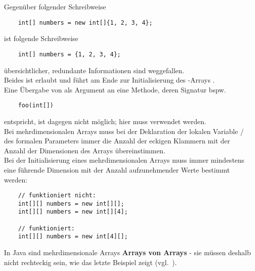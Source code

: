 \noindent
Gegenüber folgender Schreibweise

\begin{verbatim}
    int[] numbers = new int[]{1, 2, 3, 4};
\end{verbatim}

ist folgende Schreibweise

\begin{verbatim}
    int[] numbers = {1, 2, 3, 4};
\end{verbatim}

übersichtlicher, redundante Informationen sind weggefallen.\\
Beides ist erlaubt und führt am Ende zur Initialisierung des -Arrays \code{[1, 2, 3, 4]}.\\
Eine Übergabe von  als Argument an eine Methode, deren Signatur bspw.


\begin{verbatim}
    foo(int[])
\end{verbatim}

entspricht, ist dagegen nicht möglich; hier muss  verwendet werden.\\

\noindent
Bei mehrdimensionalen Arrays muss bei der Deklaration der lokalen Variable / des formalen Parameters immer die Anzahl der eckigen Klammern \code{[]} mit der Anzahl der Dimensionen des Arrays übereinstimmen.\\
Bei der Initialisierung eines mehrdimensionalen Arrays muss immer mindestens eine führende Dimension mit der Anzahl aufzunehmender Werte bestimmt werden:

\begin{verbatim}
    // funktioniert nicht:
    int[][] numbers = new int[][];
    int[][] numbers = new int[][4];

    // funktioniert:
    int[][] numbers = new int[4][];
\end{verbatim}

In Java sind mehrdimensionale Arrays \textbf{Arrays von Arrays} - sie müssen deshalb nicht rechteckig sein, wie das letzte Beispiel zeigt (vgl.~\cite[273 ff.]{Ull23}).